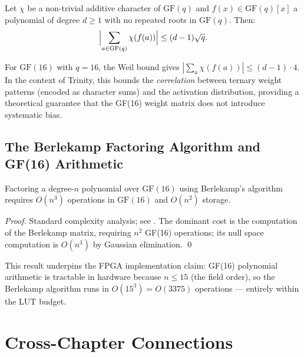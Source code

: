 \begin{theorem}
\label{thm:weil-bound}
Let \(\chi\) be a non-trivial additive character of \(\mathrm{GF}(q)\)
and \(f(x)\in\mathrm{GF}(q)[x]\) a polynomial of degree \(d\geq 1\)
with no repeated roots in \(\mathrm{GF}(q)\).
Then:
\[
  \Bigl|\sum_{a\in\mathrm{GF}(q)}\chi(f(a))\Bigr| \leq (d-1)\sqrt{q}.
\]
\end{theorem}

For \(\mathrm{GF}(16)\) with \(q=16\), the Weil bound gives
\(|\sum_a\chi(f(a))|\leq (d-1)\cdot 4\).
In the context of Trinity, this bounds the \emph{correlation}
between ternary weight patterns (encoded as character sums)
and the activation distribution, providing a theoretical guarantee
that the GF(16) weight matrix does not introduce systematic bias.

\subsection{The Berlekamp Factoring Algorithm and GF(16) Arithmetic}

\begin{proposition}
\label{prop:berlekamp}
Factoring a degree-\(n\) polynomial over \(\mathrm{GF}(16)\) using
Berlekamp's algorithm requires \(O(n^3)\) operations in \(\mathrm{GF}(16)\)
and \(O(n^2)\) storage.
\end{proposition}

\begin{proof}
Standard complexity analysis; see \textcite[Chapter~4]{lidl_finite_fields}.
The dominant cost is the computation of the Berlekamp matrix,
requiring \(n^2\) GF(16) operations; its null space computation is
\(O(n^3)\) by Gaussian elimination.
\qed
\end{proof}

This result underpins the FPGA implementation claim:
GF(16) polynomial arithmetic is tractable in hardware because
\(n\leq 15\) (the field order), so the Berlekamp algorithm runs in
\(O(15^3)=O(3375)\) operations — entirely within the LUT budget.

\section{Cross-Chapter Connections}
\label{sec:gf16-cross}

